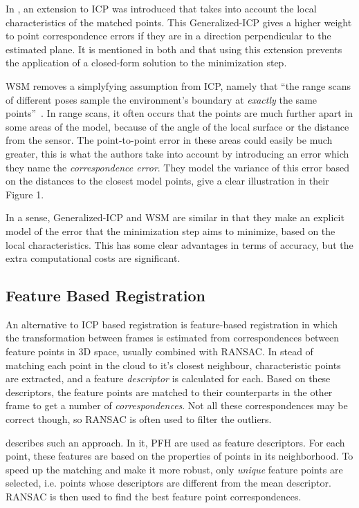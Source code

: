 \documentclass[a4paper]{article}
\begin{document}
In \cite{segal2009generalized}, an extension to \ac{ICP} was introduced that takes into account the local characteristics of the matched points. This Generalized-ICP gives a higher weight to point correspondence errors if they are in a direction perpendicular to the estimated plane. It is mentioned in both \cite{rusinkiewicz2001efficient} and \cite{segal2009generalized} that using this extension prevents the application of a closed-form solution to the minimization step.

\ac{WSM} removes a simplyfying assumption from \ac{ICP}, namely that ``the range scans of different poses sample the environment's boundary at \emph{exactly} the same points''~\cite{pfister2002weighted}. In range scans, it often occurs that the points are much further apart in some areas of the model, because of the angle of the local surface or the distance from the sensor. The point-to-point error in these areas could easily be much greater, this is what the authors take into account by introducing an error which they name the \emph{correspondence error}. They model the variance of this error based on the distances to the closest model points, \cite{slamet2008boosting} give a clear illustration in their Figure 1. 

In a sense, Generalized-ICP and \ac{WSM} are similar in that they make an explicit model of the error that the minimization step aims to minimize, based on the local characteristics. This has some clear advantages in terms of accuracy, but the extra computational costs are significant.

\subsection{Feature Based Registration}

An alternative to \ac{ICP} based registration is feature-based registration in which the transformation between frames is estimated from correspondences between feature points in 3D space, usually combined with \ac{RANSAC}. In stead of matching each point in the cloud to it's closest neighbour, characteristic points are extracted, and a feature \emph{descriptor} is calculated for each. Based on these descriptors, the feature points are matched to their counterparts in the other frame to get a number of \emph{correspondences}. Not all these correspondences may be correct though, so \ac{RANSAC} is often used to filter the outliers. 

\cite{rusu2009fast} describes such an approach. In it, \ac{PFH} are used as feature descriptors. For each point, these features are based on the properties of points in its neighborhood. To speed up the matching and make it more robust, only \emph{unique} feature points are selected, i.e. points whose descriptors are different from the mean descriptor. \ac{RANSAC} is then used to find the best feature point correspondences.  
\end{document}
